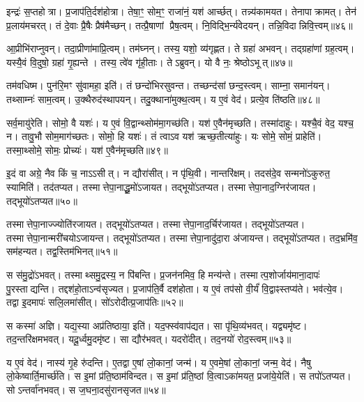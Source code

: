 इन्द्रः॑ स॒प्तहोत्रा।
प्र॒जाप॑ति॒र्दश॑होत्रा।
तेषा॒ꣳ॒ सोम॒ꣳ॒ राजा॑नं॒ यश॑ आर्च्छत्।
तन्न्य॑कामयत।
तेनापाक्रामत्।
तेन॑ प्र॒लाय॑मचरत्।
तं दे॒वाः प्रै॒षैः प्रैष॑मैच्छन्।
तत्प्रै॒षाणां प्रैष॒त्वम्।
नि॒विद्भि॒र्न्य॑वेदयन्।
तन्नि॒विदान्निवि॒त्त्वम्॥४६॥

आ॒प्रीभि॑राप्नुवन्।
तदा॒प्रीणा॑माप्रि॒त्वम्।
तम॑घ्नन्।
तस्य॒ यशो॒ व्य॑गृह्णत।
ते ग्रहा॑ अभवन्।
तद्ग्रहा॑णां ग्रह॒त्वम्।
यस्यै॒वं वि॒दुषो॒ ग्रहा॑ गृ॒ह्यन्ते।
तस्य॒ त्वे॑व गृ॑ही॒ताः।
तेऽब्रुवन्।
यो वै नः॒ श्रेष्ठो\-ऽभूत्॥४७॥

तम॑वधिष्म।
पुन॑रि॒मꣳ सु॑वामहा॒ इति॑।
तं छन्दो॑भिरसुवन्त।
तच्छन्द॑सां छन्द॒स्त्वम्।
साम्ना॒ समान॑यन्।
तथ्साम्नः॑ साम॒त्वम्।
उ॒क्थैरुद॑स्थापयन्।
तदु॒क्थाना॑मुक्थ॒त्वम्।
य ए॒वं वेद॑।
प्रत्ये॒व ति॑ष्ठति॥४८॥

सर्व॒मायु॑रेति।
सोमो॒ वै यशः॑।
य ए॒वं वि॒द्वान्थ्सोम॑मा॒गच्छ॑ति।
यश॑ ए॒वैन॑मृच्छति।
तस्मा॑दाहुः।
यश्चै॒वं वेद॒ यश्च॒ न।
तावु॒भौ सोम॒माग॑च्छतः।
सोमो॒ हि यशः॑।
तं त्वाऽव यश॑ ऋच्छ॒तीत्या॑हुः।
यः सोमे॒ सोमं॒ प्राहेति॑।
तस्मा॒थ्सोमे॒ सोमः॒ प्रोच्यः॑।
यश॑ ए॒वैन॑मृच्छति॥४९॥

इ॒दं वा अग्रे॒ नैव किं च॒ नाऽऽसीत्।
न द्यौरा॑सीत्।
न पृ॑थि॒वी।
नान्तरि॑क्षम्।
तदस॑दे॒व सन्मनो॑\-ऽकुरुत॒ स्यामिति॑।
तद॑तप्यत।
तस्मात्तेपा॒नाद्धू॒मो॑\-ऽजायत।
तद्भूयो॑\-ऽतप्यत।
तस्मात्तेपा॒नाद॒ग्निर॑जायत।
तद्भूयो॑\-ऽतप्यत॥५०॥

तस्मात्तेपा॒नाज्ज्योति॑रजायत।
तद्भूयो॑\-ऽतप्यत।
तस्मात्तेपा॒ना\-द॒र्चिर॑जायत।
तद्भूयो॑\-ऽतप्यत।
तस्मात्तेपा॒नान्मरी॑चयो\-ऽजायन्त।
तद्भूयो॑\-ऽतप्यत।
तस्मात्तेपा॒नादु॑दा॒रा अ॑जायन्त।
तद्भूयो॑\-ऽतप्यत।
तद॒भ्रमि॑व॒ सम॑हन्यत।
तद्व॒स्तिम॑भिनत्॥५१॥

स स॑मु॒द्रो॑\-ऽभवत्।
तस्माथ्समु॒द्रस्य॒ न पि॑बन्ति।
प्र॒जन॑नमिव॒ हि मन्य॑न्ते।
तस्मात्प॒शोर्जाय॑माना॒दापः॑ पु॒रस्ताद्यन्ति।
तद्दश॑हो॒ता\-ऽन्व॑सृज्यत।
प्र॒जाप॑ति॒र्वै दश॑होता।
य ए॒वं तप॑सो वी॒र्यं॑ वि॒द्वाꣴस्तप्य॑ते।
भव॑त्ये॒व।
तद्वा इ॒दमापः॑ सलि॒लमा॑सीत्।
सो॑ऽरोदीत्प्र॒जाप॑तिः॥५२॥

स कस्मा॑ अज्ञि।
यद्य॒स्या अप्र॑तिष्ठाया॒ इति॑।
यद॒फ्स्व॑वाप॑द्यत।
सा पृ॑थि॒व्य॑भवत्।
यद्व्यमृ॑ष्ट।
तद॒न्तरि॑क्षमभवत्।
यदू॒र्ध्वमु॒दमृ॑ष्ट।
सा द्यौर॑भवत्।
यदरो॑दीत्।
तद॒नयो॑ रोद॒स्त्वम्॥५३॥

य ए॒वं वेद॑।
नास्य॑ गृ॒हे रु॑दन्ति।
ए॒तद्वा ए॒षां लो॒कानां॒ जन्म॑।
य ए॒वमे॒षां लो॒कानां॒ जन्म॒ वेद॑।
नैषु लो॒केष्वार्ति॒मार्च्छ॑ति।
स इ॒मां प्र॑ति॒ष्ठाम॑विन्दत।
स इ॒मां प्र॑ति॒ष्ठां वि॒त्वा\-ऽका॑मयत॒ प्रजा॑ये॒येति॑।
स तपो॑\-ऽतप्यत।
सोऽन्तर्वा॑नभवत्।
स ज॒घना॒दसु॑रानसृजत॥५४॥

